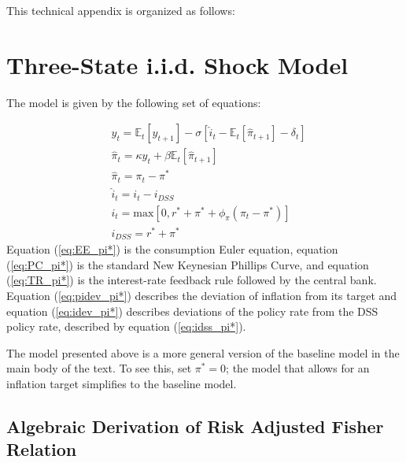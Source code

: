 \documentclass[11pt]{article}
\begin{document}
	\begin{singlespace}
		
		\vspace{2em}
		\noindent This technical appendix is organized as follows:
		
		\section{Three-State i.i.d. Shock Model}\label{A:ThreeStateiid}
		The model is given by the following set of equations: 
		
		\begin{align}
		& y_{t} = \mathbb{E}_t[y_{t+1}] - \sigma\left[\hat{i}_t - \mathbb{E}_t[\hat{\pi}_{t+1}]-\delta_t\right] \label{eq:EE_pi*}\\
		& \hat{\pi}_{t} = \kappa y_t + \beta\mathbb{E}_t[\hat{\pi}_{t+1}]\label{eq:PC_pi*}\\
		& \hat{\pi}_t = \pi_t - \pi^* \label{eq:pidev_pi*}\\
		& \hat{i}_t = i_t - i_{DSS} \label{eq:idev_pi*}\\
		& i_t = \text{max}\left[0,r^* + \pi^* + \phi_{\pi}(\pi_t - \pi^*)\right]\label{eq:TR_pi*}\\
		& i_{DSS} = r^* + \pi^* \label{eq:idss_pi*}
		\end{align}
		\noindent
		Equation (\ref{eq:EE_pi*}) is the consumption Euler equation, equation (\ref{eq:PC_pi*}) is the standard New Keynesian Phillips Curve, and equation (\ref{eq:TR_pi*}) is the interest-rate feedback rule followed by the central bank. Equation (\ref{eq:pidev_pi*}) describes the deviation of inflation from its target and equation (\ref{eq:idev_pi*}) describes deviations of the policy rate from the DSS policy rate, described by equation (\ref{eq:idss_pi*}). 
		
		The model presented above is a more general version of the baseline model in the main body of the text. To see this, set $\pi^* = 0$; the model that allows for an inflation target simplifies to the baseline model.
		
		\subsection{Algebraic Derivation of Risk Adjusted Fisher Relation}
		

\end{singlespace}
\end{document}

